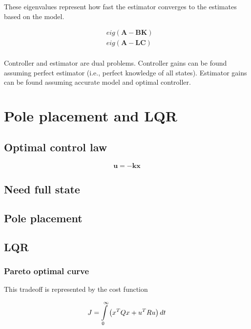 \documentclass[10pt,conference,compsoc]{IEEEtran}
\newcommand{\mtx}[1] {\bm #1}
\begin{document}
\noindent These eigenvalues represent how fast the estimator converges to the
estimates based on the model.

\begin{align}
  &eig(\mtx{A} - \mtx{B}\mtx{K}) \\
  &eig(\mtx{A} - \mtx{L}\mtx{C}) \\ \nonumber
\end{align}

\noindent Controller and estimator are dual problems. Controller gains can be
found assuming perfect estimator (i.e., perfect knowledge of all states).
Estimator gains can be found assuming accurate model and optimal controller.

\section{Pole placement and LQR}

\subsection{Optimal control law}

\begin{equation}
  \mtx{u} = -\mtx{k}\mtx{x}
\end{equation}

\subsection{Need full state}

\subsection{Pole placement}

\subsection{LQR}

\subsubsection{Pareto optimal curve}

This tradeoff is represented by the cost function

\begin{equation*}
  J = \int\limits_0^\infty \left(x^T Q x + u^T R u \right) dt \\
\end{equation*}
\end{document}
